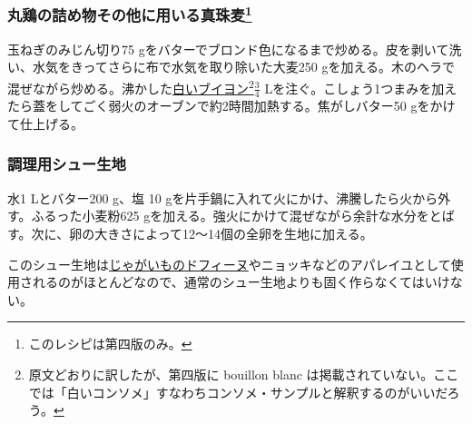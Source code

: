 \begin{recette}
\atoaki{}

\hypertarget{orge-perle-pour-volailles-farcies}{%
\subsubsection[丸鶏の詰め物その他に用いる真珠麦]{\texorpdfstring{丸鶏の詰め物その他に用いる真珠麦\footnote{このレシピは第四版のみ。}}{丸鶏の詰め物その他に用いる真珠麦}}\label{orge-perle-pour-volailles-farcies}}



玉ねぎのみじん切り75
gをバターでブロンド色になるまで炒める。皮を剥いて洗い、水気をきってさらに布で水気を取り除いた大麦250
gを加える。木のヘラで混ぜながら炒める。沸かした\protect\hyperlink{consomme-blanc}{白いブイヨン}\footnote{原文どおりに訳したが、第四版に
  bouillon blanc
  は掲載されていない。ここでは「白いコンソメ」すなわちコンソメ・サンプルと解釈するのがいいだろう。}\(\frac{3}{4}\)
Lを注ぐ。こしょう1つまみを加えたら蓋をしてごく弱火のオーブンで約2時間加熱する。焦がしバター50
gをかけて仕上げる。

\atoaki{}

\hypertarget{pate-a-chou-d-office}{%
\subsubsection{調理用シュー生地}\label{pate-a-chou-d-office}}



水1 Lとバター200 g、塩 10
gを片手鍋に入れて火にかけ、沸騰したら火から外す。ふるった小麦粉625
gを加える。強火にかけて混ぜながら余計な水分をとばす。次に、卵の大きさによって12〜14個の全卵を生地に加える。

このシュー生地は\protect\hyperlink{pomme-dauphine}{じゃがいものドフィーヌ}やニョッキなどのアパレイユとして使用されるのがほとんどなので、通常のシュー生地よりも固く作らなくてはいけない。


\end{recette}
